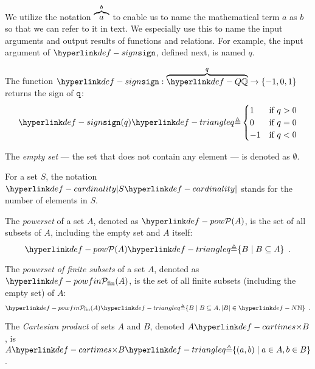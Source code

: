 We utilize the notation $\overbrace{a}^{b}$ to enable us to name the mathematical term $a$ as $b$ so that
we can refer to it in text. We especially use this to name the input arguments and
output results of functions and relations. For example, the input argument of $\sign$,
defined next, is named $q$.

\hypertarget{def-sign}{}
\begin{definition}
  The function $\sign : \overname{\Q}{q} \rightarrow \{-1,0,1\}$ returns the sign of $\texttt{q}$:
\[
\sign(q) \triangleq \begin{cases}
  1 & \text{if }q > 0\\
  0 & \text{if }q = 0\\
  -1 & \text{if }q < 0
\end{cases}
\]
\end{definition}

\begin{definition}
  The \emph{empty set} --- the set that does not contain any element --- is denoted as $\emptyset$.
\end{definition}

\hypertarget{def-cardinality}{}
\begin{definition}
  For a set $S$, the notation $\cardinality{S}$ stands for the number of elements in $S$.
\end{definition}

\hypertarget{def-pow}{}
\begin{definition}[Powerset]
The \emph{powerset} of a set $A$, denoted as $\pow{A}$, is the set of all subsets of $A$, including the empty set and $A$ itself:
\[
    \pow{A} \triangleq \{ B \;|\; B \subseteq A\} \enspace.
\]
\end{definition}

\hypertarget{def-powfin}{}
\begin{definition}
  The \emph{powerset of finite subsets} of a set $A$, denoted as $\powfin{A}$, is the set of all finite subsets (including the empty set) of $A$:
  \[
     \powfin{A} \triangleq \{ B \;|\; B \subseteq A, |B| \in \N\} \enspace.
  \]
\end{definition}

\hypertarget{def-cartimes}{}
\begin{definition}
    The \emph{Cartesian product} of sets $A$ and $B$, denoted $A \cartimes B$,
    is $A \cartimes B \triangleq \{(a,b) \;|\; a \in A, b \in B\}$.
\end{definition}

